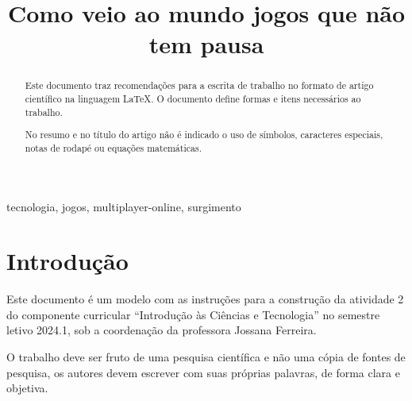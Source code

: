 \documentclass[conference]{ModeloA}
\begin{document}
\title{Como veio ao mundo jogos que não tem pausa}

\author{
\and
}


\maketitle
\begin{abstract}

Este documento traz recomendações para a escrita de trabalho no formato de artigo científico na linguagem \LaTeX. O documento define formas e itens necessários ao trabalho. 

No resumo e no título do artigo não é indicado o uso de símbolos, caracteres especiais, notas de rodapé ou equações matemáticas.

\end{abstract}

\begin{IEEEkeywords}
tecnologia, jogos, multiplayer-online, surgimento
\end{IEEEkeywords}


\section{Introdução}
Este documento é um modelo com as instruções para a construção da atividade 2 do componente curricular ``Introdução às Ciências e Tecnologia'' no semestre letivo 2024.1, sob a coordenação da professora Jossana Ferreira. 

O trabalho deve ser fruto de uma pesquisa científica e não uma cópia de fontes de pesquisa, os autores devem escrever com suas próprias palavras, de forma clara e objetiva.

\end{document}
